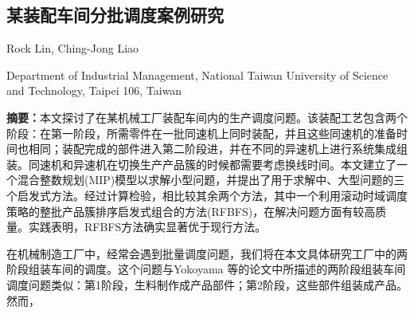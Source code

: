 
\begin{Abstract}
\chapter*{某装配车间分批调度案例研究}
\begin{center}
\vspace{2mm}
{
 {\xiaosi Rock Lin, Ching-Jong Liao}

 {\xiaowu Department of Industrial Management, National Taiwan University of Science and Technology, Taipei 106, Taiwan}
}
\end{center}
{\wuhao \songti 
\noindent \textbf{摘要：}本文探讨了在某机械工厂装配车间内的生产调度问题。该装配工艺包含两个阶段：在第一阶段，所需零件在一批同速机上同时装配，并且这些同速机的准备时间也相同；装配完成的部件进入第二阶段进，并在不同的异速机上进行系统集成组装。同速机和异速机在切换生产产品簇的时候都需要考虑换线时间。本文建立了一个混合整数规划(MIP)模型以求解小型问题，并提出了用于求解中、大型问题的三个启发式方法。经过计算检验，相比较其余两个方法，其中一个利用滚动时域调度策略的整批产品簇排序启发式组合的方法(RFBFS)，在解决问题方面有较高质量。实践表明，RFBFS方法确实显著优于现行方法。

}
\end{Abstract}

在机械制造工厂中，经常会遇到批量调度问题，我们将在本文具体研究工厂中的两阶段组装车间的调度。这个问题与Yokoyama 等的论文中所描述的两阶段组装车间调度问题类似：第1阶段，生料制作成产品部件；第2阶段，这些部件组装成产品。然而，



